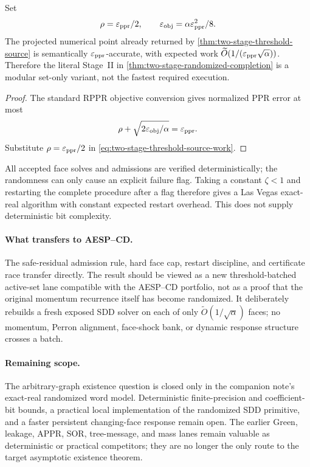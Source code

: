 \begin{corollary}
\label{cor:two-stage-randomized-direct-return}
Set
\begin{equation*}
 \rho=\varepsilon_{\mathrm{ppr}}/2,
 \qquad
 \varepsilon_{\rm obj}=\alpha\varepsilon_{\mathrm{ppr}}^2/8.
\end{equation*}
The projected numerical point already returned by
\cref{thm:two-stage-threshold-source} is semantically
$\varepsilon_{\mathrm{ppr}}$-accurate, with expected work
$\widetilde O(1/(\varepsilon_{\mathrm{ppr}}\sqrt\alpha))$.  Therefore the literal Stage~II in
\cref{thm:two-stage-randomized-completion} is a modular set-only variant, not
the fastest required execution.
\end{corollary}

\begin{proof}
The standard RPPR objective conversion gives normalized PPR error at most
\begin{equation*}
 \rho+\sqrt{2\varepsilon_{\rm obj}/\alpha}=\varepsilon_{\mathrm{ppr}}.
\end{equation*}
Substitute $\rho=\varepsilon_{\mathrm{ppr}}/2$ in
\cref{eq:two-stage-threshold-source-work}.
\end{proof}

\begin{remark}
All accepted face solves and admissions are verified deterministically; the
randomness can only cause an explicit failure flag.  Taking a constant
$\zeta<1$ and restarting the complete procedure after a flag therefore gives
a Las Vegas exact-real algorithm with constant expected restart overhead.
This does not supply deterministic bit complexity.
\end{remark}

\paragraph{What transfers to AESP--CD.}
The safe-residual admission rule, hard face cap, restart discipline, and
certificate race transfer directly.  The result should be viewed as a new
threshold-batched active-set lane compatible with the AESP--CD portfolio, not
as a proof that the original momentum recurrence itself has become
randomized.  It deliberately rebuilds a fresh exposed SDD solver on each of
only $\widetilde O(1/\sqrt\alpha)$ faces; no momentum, Perron alignment,
face-shock bank, or dynamic response structure crosses a batch.

\paragraph{Remaining scope.}
The arbitrary-graph existence question is closed only in the companion
note's exact-real randomized word model.  Deterministic finite-precision and
coefficient-bit bounds, a practical local implementation of the randomized
SDD primitive, and a faster persistent changing-face response remain open.
The earlier Green, leakage, APPR, SOR, tree-message, and mass lanes remain
valuable as deterministic or practical competitors; they are no longer the
only route to the target asymptotic existence theorem.
